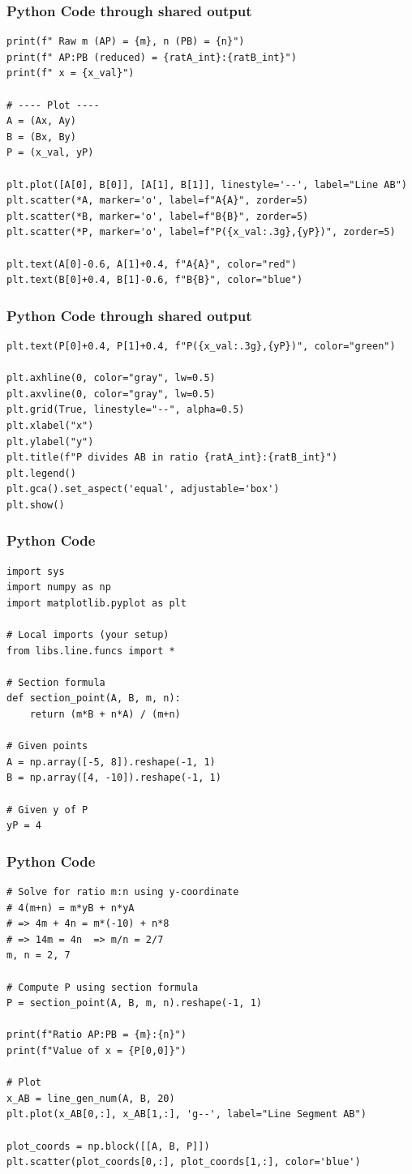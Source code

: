 \documentclass{beamer}
\begin{document}
\begin{frame}[fragile]
	\frametitle{Python Code through shared output}
	\begin{lstlisting}
print(f" Raw m (AP) = {m}, n (PB) = {n}")
print(f" AP:PB (reduced) = {ratA_int}:{ratB_int}")
print(f" x = {x_val}")

# ---- Plot ----
A = (Ax, Ay)
B = (Bx, By)
P = (x_val, yP)

plt.plot([A[0], B[0]], [A[1], B[1]], linestyle='--', label="Line AB")
plt.scatter(*A, marker='o', label=f"A{A}", zorder=5)
plt.scatter(*B, marker='o', label=f"B{B}", zorder=5)
plt.scatter(*P, marker='o', label=f"P({x_val:.3g},{yP})", zorder=5)

plt.text(A[0]-0.6, A[1]+0.4, f"A{A}", color="red")
plt.text(B[0]+0.4, B[1]-0.6, f"B{B}", color="blue")
\end{lstlisting}
\end{frame}
\begin{frame}[fragile]
	\frametitle{Python Code through shared output}
	\begin{lstlisting}
plt.text(P[0]+0.4, P[1]+0.4, f"P({x_val:.3g},{yP})", color="green")

plt.axhline(0, color="gray", lw=0.5)
plt.axvline(0, color="gray", lw=0.5)
plt.grid(True, linestyle="--", alpha=0.5)
plt.xlabel("x")
plt.ylabel("y")
plt.title(f"P divides AB in ratio {ratA_int}:{ratB_int}")
plt.legend()
plt.gca().set_aspect('equal', adjustable='box')
plt.show()
\end{lstlisting}
\end{frame}
\begin{frame}[fragile]
    \frametitle{Python Code}
    \begin{lstlisting}
import sys 
import numpy as np
import matplotlib.pyplot as plt

# Local imports (your setup)
from libs.line.funcs import *

# Section formula
def section_point(A, B, m, n):
    return (m*B + n*A) / (m+n)

# Given points
A = np.array([-5, 8]).reshape(-1, 1)
B = np.array([4, -10]).reshape(-1, 1)

# Given y of P
yP = 4
\end{lstlisting}
\end{frame}
\begin{frame}[fragile]
    \frametitle{Python Code}
    \begin{lstlisting}
# Solve for ratio m:n using y-coordinate
# 4(m+n) = m*yB + n*yA
# => 4m + 4n = m*(-10) + n*8
# => 14m = 4n  => m/n = 2/7
m, n = 2, 7

# Compute P using section formula
P = section_point(A, B, m, n).reshape(-1, 1)

print(f"Ratio AP:PB = {m}:{n}")
print(f"Value of x = {P[0,0]}")

# Plot
x_AB = line_gen_num(A, B, 20)
plt.plot(x_AB[0,:], x_AB[1,:], 'g--', label="Line Segment AB")

plot_coords = np.block([[A, B, P]])
plt.scatter(plot_coords[0,:], plot_coords[1,:], color='blue')
\end{lstlisting}
\end{frame}
\end{document}
